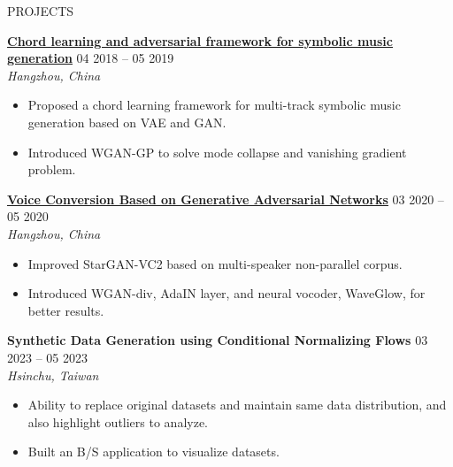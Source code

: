 \documentclass{resume} %
\begin{document}
\begin{rSection}{PROJECTS}
\vspace{-1.25em}
\item \textbf{\href{https://docs.google.com/presentation/d/1ge2It3UsAvTwpAk-9LUnmiz7dRqJnpFX/edit?usp=sharing&ouid=101248488395326982475&rtpof=true&sd=true}{\textbf{\large{\underline{Chord learning and adversarial framework for symbolic music generation}}}}} \hfill {04 2018 – 05 2019}\\\mbox{} \hfill \textit{Hangzhou, China}
\begin{itemize}
    \item Proposed a chord learning framework for multi-track symbolic music generation based on VAE and GAN.
    \item Introduced WGAN-GP to solve mode collapse and vanishing gradient problem.
\end{itemize}
\item \textbf{\href{https://drive.google.com/file/d/1QqgPoRGhaSeS0QWrjnR8mxhvV_onwZ5y/view?usp=drive_link}{\textbf{\large{\underline{Voice Conversion Based on Generative Adversarial Networks}}}}} \hfill {03 2020 -- 05 2020}\\\mbox{} \hfill \textit{Hangzhou, China}
\begin{itemize}
    \item Improved StarGAN-VC2 based on multi-speaker non-parallel corpus.
    \item Introduced WGAN-div, AdaIN layer, and neural vocoder, WaveGlow, for better results.
\end{itemize}
\item \textbf{Synthetic Data Generation using Conditional Normalizing Flows} \hfill {03 2023 -- 05 2023}\\\mbox{} \hfill \textit{Hsinchu, Taiwan}
\begin{itemize}
    \item Ability to replace original datasets and maintain same data distribution, and also highlight outliers to analyze.
    \item Built an B/S application to visualize datasets.
\end{itemize}
\end{rSection} 
\end{document}
